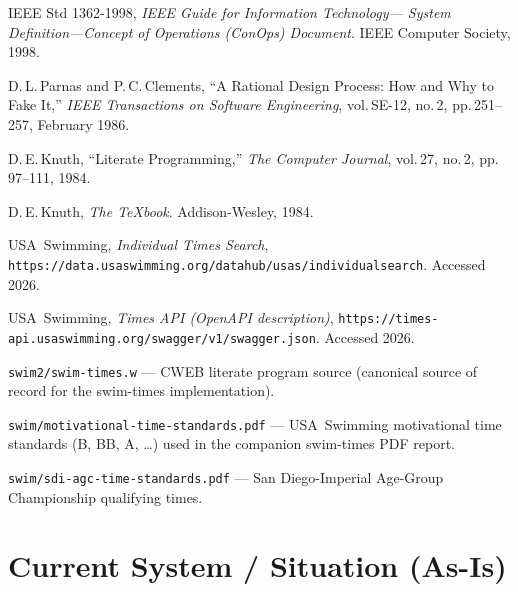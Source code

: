 \documentclass[12pt]{article}
\newcommand{\code}[1]{\texttt{#1}}
\begin{document}
\begin{enumerate}[label={[\arabic*]}]
  \item IEEE Std 1362-1998, \textit{IEEE Guide for Information Technology---
        System Definition---Concept of Operations (ConOps) Document}.
        IEEE Computer Society, 1998.

  \item D.\,L.\,Parnas and P.\,C.\,Clements, ``A Rational Design Process:
        How and Why to Fake It,''
        \textit{IEEE Transactions on Software Engineering},
        vol.\,SE-12, no.\,2, pp.\,251--257, February 1986.

  \item D.\,E.\,Knuth, ``Literate Programming,''
        \textit{The Computer Journal}, vol.\,27, no.\,2,
        pp.\,97--111, 1984.

  \item D.\,E.\,Knuth, \textit{The \TeX{}book}.
        Addison-Wesley, 1984.

  \item USA~Swimming, \textit{Individual Times Search},
        \texttt{https://data.usaswimming.org/datahub/usas/individualsearch}.
        Accessed 2026.

  \item USA~Swimming, \textit{Times API (OpenAPI description)},
        \texttt{https://times-api.usaswimming.org/swagger/v1/swagger.json}.
        Accessed 2026.

  \item \code{swim2/swim-times.w} --- CWEB literate program source
        (canonical source of record for the swim-times implementation).

  \item \code{swim/motivational-time-standards.pdf} --- USA~Swimming
        motivational time standards (B, BB, A, \ldots) used in
        the companion swim-times PDF report.

  \item \code{swim/sdi-agc-time-standards.pdf} --- San Diego-Imperial
        Age-Group Championship qualifying times.
\end{enumerate}

\section{Current System / Situation (As-Is)}
\end{document}
